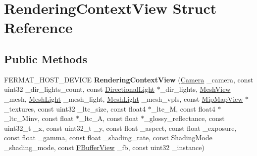 \hypertarget{struct_rendering_context_view}{}\section{Rendering\+Context\+View Struct Reference}
\label{struct_rendering_context_view}
\subsection*{Public Methods}
\begin{DoxyCompactItemize}
\item 
\mbox{\label{struct_rendering_context_view_ab061dbc157232293bffc2d4324efad04}} 
F\+E\+R\+M\+A\+T\+\_\+\+H\+O\+S\+T\+\_\+\+D\+E\+V\+I\+CE {\bfseries Rendering\+Context\+View} (\hyperlink{struct_camera}{Camera} \+\_\+camera, const uint32 \+\_\+dir\+\_\+lights\+\_\+count, const \hyperlink{struct_directional_light}{Directional\+Light} $\ast$\+\_\+dir\+\_\+lights, \hyperlink{struct_mesh_view}{Mesh\+View} \+\_\+mesh, \hyperlink{struct_mesh_light}{Mesh\+Light} \+\_\+mesh\+\_\+light, \hyperlink{struct_mesh_light}{Mesh\+Light} \+\_\+mesh\+\_\+vpls, const \hyperlink{struct_mip_map_view}{Mip\+Map\+View} $\ast$\+\_\+textures, const uint32 \+\_\+ltc\+\_\+size, const float4 $\ast$\+\_\+ltc\+\_\+M, const float4 $\ast$\+\_\+ltc\+\_\+\+Minv, const float $\ast$\+\_\+ltc\+\_\+A, const float $\ast$\+\_\+glossy\+\_\+reflectance, const uint32\+\_\+t \+\_\+x, const uint32\+\_\+t \+\_\+y, const float \+\_\+aspect, const float \+\_\+exposure, const float \+\_\+gamma, const float \+\_\+shading\+\_\+rate, const Shading\+Mode \+\_\+shading\+\_\+mode, const \hyperlink{struct_f_buffer_view}{F\+Buffer\+View} \+\_\+fb, const uint32 \+\_\+instance)
\end{DoxyCompactItemize}
